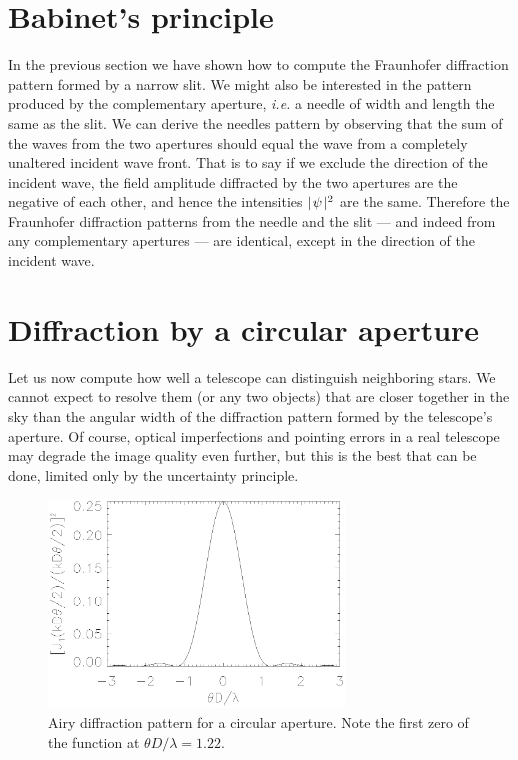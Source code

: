 
\section{Babinet's principle}

In the previous section we have shown how to compute the Fraunhofer diffraction pattern formed
by a narrow slit. We might also be interested in the pattern produced by the complementary
aperture, {\it i.e.} a needle of width and length the same as the slit. We can derive the 
needles pattern by observing that the sum of the waves from the two apertures should equal the
wave from a completely unaltered incident wave front. That is to say if we exclude the
direction of the incident wave, the field amplitude diffracted by the two apertures are the
negative of each other, and hence the intensities $\mid\!\psi\!\mid^2$ are the same. 
Therefore the Fraunhofer diffraction patterns from the needle and the slit --- and indeed from
any complementary apertures --- are identical, except in the direction of the incident 
wave.

\section{Diffraction by a circular aperture}

Let us now compute how well a telescope can distinguish neighboring stars. We cannot expect to
resolve them (or any two objects) that are closer together in the sky than the angular width
of the diffraction pattern formed by the telescope's aperture. Of course, optical imperfections
and pointing errors in a real telescope may degrade the image quality even further, but this
is the best that can be done, limited only by the uncertainty principle.

\begin{figure}[th!]
	\centering
	\includegraphics[width=0.7\textwidth]{jinc2.eps}
  \caption{Airy diffraction pattern for a circular aperture. Note the first zero
of the function at $\theta D/\lambda=1.22$.}
  \label{fig:jinc2}
\end{figure}

